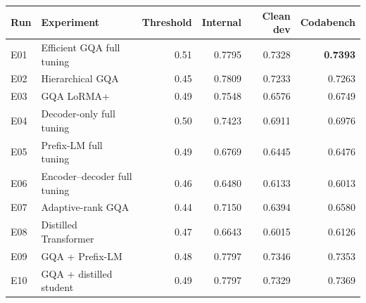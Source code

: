 \begin{tabular}{llrrrr}
\toprule
Run & Experiment & Threshold & Internal & Clean dev & Codabench \\
\midrule
E01 & Efficient GQA full tuning & 0.51 & 0.7795 & 0.7328 & \textbf{0.7393} \\
E02 & Hierarchical GQA & 0.45 & 0.7809 & 0.7233 & 0.7263 \\
E03 & GQA LoRMA+ & 0.49 & 0.7548 & 0.6576 & 0.6749 \\
E04 & Decoder-only full tuning & 0.50 & 0.7423 & 0.6911 & 0.6976 \\
E05 & Prefix-LM full tuning & 0.49 & 0.6769 & 0.6445 & 0.6476 \\
E06 & Encoder--decoder full tuning & 0.46 & 0.6480 & 0.6133 & 0.6013 \\
E07 & Adaptive-rank GQA & 0.44 & 0.7150 & 0.6394 & 0.6580 \\
E08 & Distilled Transformer & 0.47 & 0.6643 & 0.6015 & 0.6126 \\
E09 & GQA + Prefix-LM & 0.48 & 0.7797 & 0.7346 & 0.7353 \\
E10 & GQA + distilled student & 0.49 & 0.7797 & 0.7329 & 0.7369 \\
\bottomrule
\end{tabular}
